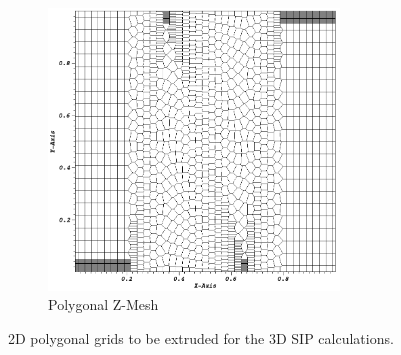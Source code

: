 \begin{figure}
\begin{subfigure}[b]{0.45\textwidth}
		\includegraphics[width=0.85\textwidth]{figures/sec_DSA/SIP_z_poly_mesh.png}
		\caption{Polygonal Z-Mesh}
	\end{subfigure}
\caption{2D polygonal grids to be extruded for the 3D SIP calculations.}
\label{fig::SIP_mesh_slices}
\end{figure}

